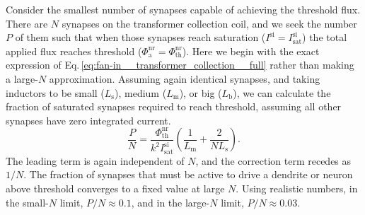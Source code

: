\documentclass[twocolumn]{article}
\begin{document}
Consider the smallest number of synapses capable of achieving the threshold flux. There are $N$ synapses on the transformer collection coil, and we seek the number $P$ of them such that when those synapses reach saturation ($I^{\mathrm{si}} = I^{\mathrm{si}}_{\mathrm{sat}}$) the total applied flux reaches threshold ($\Phi^{\mathrm{nr}}_{\mathrm{a}} = \Phi^{\mathrm{nr}}_{\mathrm{th}}$). Here we begin with the exact expression of Eq.\,\ref{eq:fan-in__transformer_collection__full} rather than making a large-$N$ approximation. Assuming again identical synapses, and taking inductors to be small ($L_{\mathrm{s}}$), medium ($L_{\mathrm{m}}$), or big ($L_{\mathrm{b}}$), we can calculate the fraction of saturated synapses required to reach threshold, assuming all other synapses have zero integrated current.
\begin{equation}
\label{eq:fan-in__transformer_collection__fraction_for_threshold}
\frac{P}{N} = \frac{ \Phi^{\mathrm{nr}}_{\mathrm{th}} }{ k^2  I^{\mathrm{si}}_{\mathrm{sat}} } \left( \frac{1}{ L_{\mathrm{m}} } + \frac{2}{ N L_{\mathrm{s}} }  \right).
\end{equation}
The leading term is again independent of $N$, and the correction term recedes as $1/N$. The fraction of synapses that must be active to drive a dendrite or neuron above threshold converges to a fixed value at large $N$. Using realistic numbers, in the small-$N$ limit, $P/N \approx 0.1$, and in the large-$N$ limit, $P/N \approx 0.03$.
\end{document}
